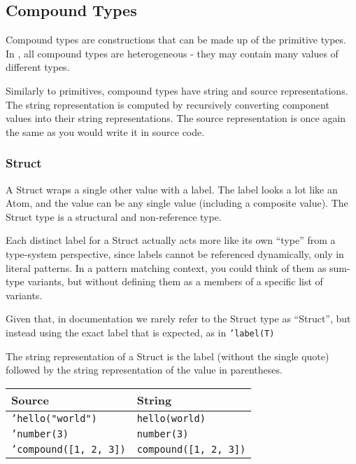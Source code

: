 \subsection{Compound Types}
\label{sec:compound-types}

Compound types are constructions that can be made up of the primitive
types. In \Trilogy{}, all compound types are heterogeneous - they may
contain many values of different types.

Similarly to primitives, compound types have string and source
representations. The string representation is computed by recursively
converting component values into their string representations. The
source representation is once again the same as you would write it
in source code.

\subsubsection{Struct}

A Struct wraps a single other value with a label. The label looks a
lot like an Atom, and the value can be any single value (including
a composite value). The Struct type is a structural and non-reference
type.

Each distinct label for a Struct actually acts more like its own ``type'' from
a type-system perspective, since labels cannot be referenced dynamically, only
in literal patterns. In a pattern matching context, you could think of them as
sum-type variants, but without defining them as a members of a specific list
of variants.

Given that, in documentation we rarely refer to the Struct type as ``Struct'',
but instead using the exact label that is expected, as in \texttt{'label(T)}

The string representation of a Struct is the label (without the single quote)
followed by the string representation of the value in parentheses.

\begin{table}[H]
    \centering
    \begin{tabular}{ll}
        \hline
        \textbf{Source} & \textbf{String} \\
        \hline
        \texttt{'hello("world")} & \texttt{hello(world)} \\
        \texttt{'number(3)} & \texttt{number(3)} \\
        \texttt{'compound([1, 2, 3])} & \texttt{compound([1, 2, 3])} \\
        \hline
    \end{tabular}
\end{table}

